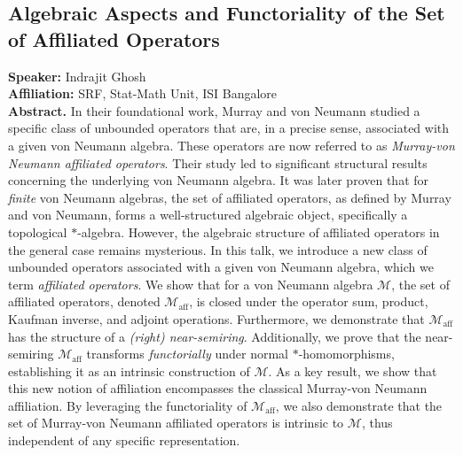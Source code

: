 %
%
\subsection*{Algebraic Aspects and Functoriality of the Set of Affiliated Operators} %
\noindent
\textbf{Speaker:} Indrajit Ghosh \\ %
\textbf{Affiliation:} SRF, Stat-Math Unit, ISI Bangalore \\ %

\noindent\textbf{Abstract.}
In their foundational work, Murray and von Neumann studied a specific class of unbounded operators that are, in a precise sense, associated with a given von Neumann algebra. These operators are now referred to as \emph{Murray-von Neumann affiliated operators}. Their study led to significant structural results concerning the underlying von Neumann algebra. It was later proven that for \emph{finite} von Neumann algebras, the set of affiliated operators, as defined by Murray and von Neumann, forms a well-structured algebraic object, specifically a topological $*$-algebra. However, the algebraic structure of affiliated operators in the general case remains mysterious. In this talk, we introduce a new class of unbounded operators associated with a given von Neumann algebra, which we term \textit{affiliated operators}. We show that for a von Neumann algebra $\mathscr{M}$, the set of affiliated operators, denoted $\mathscr{M}_{\textrm{aff}}$, is closed under the operator sum, product, Kaufman inverse, and adjoint operations. Furthermore, we demonstrate that $\mathscr{M}_{\textrm{aff}}$ has the structure of a \textit{(right) near-semiring}. Additionally, we prove that the near-semiring $\mathscr{M}_{\textrm{aff}}$ transforms \textit{functorially} under normal $*$-homomorphisms, establishing it as an intrinsic construction of $\mathscr{M}$. As a key result, we show that this new notion of affiliation encompasses the classical Murray-von Neumann affiliation. By leveraging the functoriality of $\mathscr{M}_{\textrm{aff}}$, we also demonstrate that the set of Murray-von Neumann affiliated operators is intrinsic to $\mathscr{M}$, thus independent of any specific representation.


